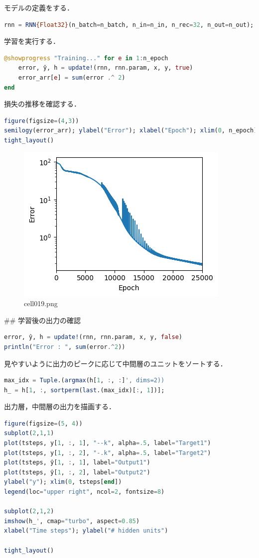 モデルの定義をする．
\begin{lstlisting}[language=julia]
rnn = RNN{Float32}(n_batch=n_batch, n_in=n_in, n_rec=32, n_out=n_out);
\end{lstlisting}
学習を実行する．
\begin{lstlisting}[language=julia]
@showprogress "Training..." for e in 1:n_epoch
    error, ŷ, h = update!(rnn, rnn.param, x, y, true)
    error_arr[e] = sum(error .^ 2)
end
\end{lstlisting}
損失の推移を確認する．
\begin{lstlisting}[language=julia]
figure(figsize=(4,3))
semilogy(error_arr); ylabel("Error"); xlabel("Epoch"); xlim(0, n_epoch)
tight_layout()
\end{lstlisting}
\begin{figure}[ht]
	\centering
	\includegraphics[scale=0.8, max width=\linewidth]{./fig/solve-credit-assignment-problem/bptt/cell019.png}
	\caption{cell019.png}
	\label{cell019.png}
\end{figure}
## 学習後の出力の確認
\begin{lstlisting}[language=julia]
error, ŷ, h = update!(rnn, rnn.param, x, y, false)
println("Error : ", sum(error.^2))
\end{lstlisting}
見やすいように出力のピークに応じて中間層のユニットをソートする．
\begin{lstlisting}[language=julia]
max_idx = Tuple.(argmax(h[1, :, :]', dims=2))
h_ = h[1, :, sortperm(last.(max_idx)[:, 1])];
\end{lstlisting}
出力層，中間層の出力を描画する．
\begin{lstlisting}[language=julia]
figure(figsize=(5, 4))
subplot(2,1,1)
plot(tsteps, y[1, :, 1], "--k", alpha=.5, label="Target1")
plot(tsteps, y[1, :, 2], "-.k", alpha=.5, label="Target2")
plot(tsteps, ŷ[1, :, 1], label="Output1")
plot(tsteps, ŷ[1, :, 2], label="Output2")
ylabel("y"); xlim(0, tsteps[end])
legend(loc="upper right", ncol=2, fontsize=8)

subplot(2,1,2)
imshow(h_', cmap="turbo", aspect=0.85)
xlabel("Time steps"); ylabel("# hidden units")

tight_layout()
\end{lstlisting}
